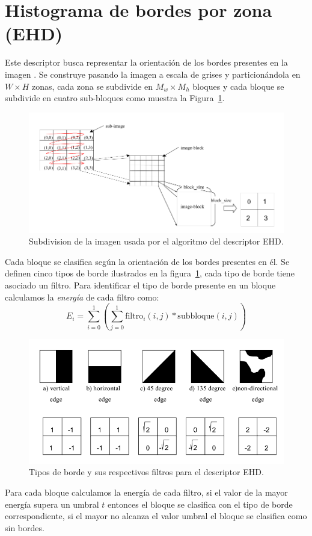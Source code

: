 \section{Histograma de bordes por zona (EHD)}
Este descriptor busca representar la orientación de los bordes presentes en la imagen \cite{Manjunath:ehd}. Se construye pasando la imagen a escala de grises y particionándola en $W \times H$ zonas, cada zona se subdivide en $M_w \times M_h$ bloques y cada bloque se subdivide en cuatro sub-bloques como muestra la Figura~\ref{ehd_blocks}. 
    \begin{figure}[!h]
		\centering
		\includegraphics[scale=0.45]{imagenes/cap3/ehd_blocks.png}
		\caption{Subdivision de la imagen usada por el algoritmo del descriptor EHD.}
		\label{ehd_blocks}
	\end{figure}
Cada bloque se clasifica según la orientación de los bordes presentes en él. Se definen cinco tipos de borde ilustrados en la figura~\ref{ehd_blocks}, cada tipo de borde tiene asociado un filtro. Para identificar el tipo de borde presente en un bloque calculamos la \emph{energía} de cada filtro como: 
\begin{equation*}
E_i =  \displaystyle\sum_{i=0}^{1} \left(\displaystyle\sum_{j=0}^{1} \text{filtro}_i(i,j) * \text{subbloque}(i,j)\right)
\end{equation*}

    \begin{figure}[!h]
		\centering
		\includegraphics[scale=0.45]{imagenes/cap3/ehd_filters.png}
		\caption{Tipos de borde y sus respectivos filtros para el descriptor EHD.}
		\label{ehd_filters}
	\end{figure}
Para cada bloque calculamos la energía de cada filtro, si el valor de la mayor energía supera un umbral $t$ entonces el bloque se clasifica con el tipo de borde correspondiente, si el mayor no alcanza el valor umbral el bloque se clasifica como sin bordes.

